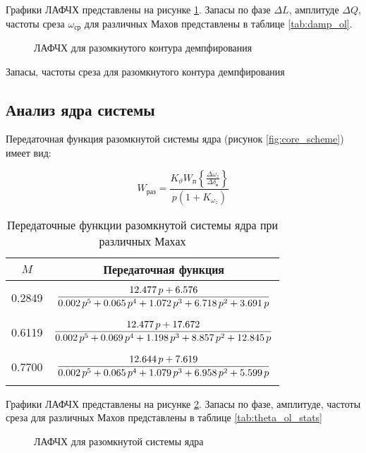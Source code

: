 Графики ЛАФЧХ представлены на рисунке \ref{fig:damp_ol}. Запасы по фазе
$\Delta L$, амплитуде $\Delta Q$, частоты среза $\omega_{ср}$ для различных
Махов представлены в таблице \ref{tab:damp_ol}.


\begin{figure}[H]
    \centering
    
    \caption{ЛАФЧХ для разомкнутого контура демпфирования}
    \label{fig:damp_ol}
\end{figure}

\begin{table}[H]
    \centering
    \caption{Запасы, частоты среза для разомкнутого контура демпфирования} 
    \label{tab:damp_ol}
    
\end{table}

\subsection{Анализ ядра системы}
Передаточная функция разомкнутой системы ядра (рисунок \ref{fig:core_scheme}) имеет вид:

\begin{equation}
    W_{раз} = \frac{K_\vartheta W_{п} \left\{\frac{\Delta \omega_z}{\Delta \delta_\text{в}} \right\}}{p(1 + K_{\omega_z}) }
\end{equation}

\begin{table}[H]
    \centering
    \caption{Передаточные функции разомкнутой системы ядра при различных Махах}
    \label{tab:core_tf_ol}
    \begin{tabular}{|c|c|}
    \hline
    $M$ & Передаточная функция\\ 
    \hline
    0.2849 & $\displaystyle \frac{12.477\,p+6.576}{0.002\,p^5+0.065\,p^4+1.072\,p^3+6.718\,p^2+3.691\,p} \addstrut{3em}$\\ 
    \hline
    0.6119 & $\displaystyle \frac{12.477\,p+17.672}{0.002\,p^5+0.069\,p^4+1.198\,p^3+8.857\,p^2+12.845\,p}\addstrut{3em}$\\
    \hline
    0.7700 & $\displaystyle \frac{12.644\,p+7.619}{0.002\,p^5+0.065\,p^4+1.079\,p^3+6.958\,p^2+5.599\,p}\addstrut{3em}$ \\
    \hline
    \end{tabular}
\end{table}

Графики ЛАФЧХ представлены на рисунке \ref{fig:theta_ol}. Запасы по фазе, амплитуде, частоты среза для различных Махов представлены в таблице \ref{tab:theta_ol_stats}
\begin{figure}[H]
    \centering
    
    \caption{ЛАФЧХ для разомкнутой системы ядра}
    \label{fig:theta_ol}
\end{figure}

